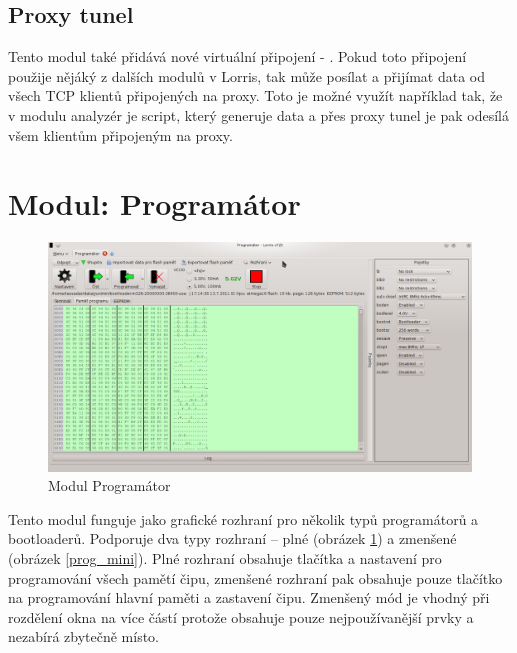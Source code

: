 \documentclass[12pt, a4paper, oneside]{article}
\begin{document}
\subsection{Proxy tunel}
Tento modul také přidává nové virtuální připojení - . Pokud toto připojení použije nějáký z dalších modulů v Lorris, tak může posílat a přijímat data od všech TCP klientů připojených na proxy. Toto je možné využít například tak, že v modulu analyzér je script, který generuje data a přes proxy tunel je pak odesílá všem klientům připojeným na proxy.

\newpage
\setlength{\voffset}{0mm} %
\pagestyle{plain}

\section{Modul: Programátor}
\begin{figure}[H]
\begin{center}
\includegraphics[width=\textwidth]{img/programmer.png}
\caption{Modul Programátor}
\label{prog_full}
\end{center}
\end{figure}

Tento modul funguje jako grafické rozhraní pro několik typů programátorů a bootloaderů. Podporuje dva typy rozhraní -- plné (obrázek \ref{prog_full}) a zmenšené (obrázek \ref{prog_mini}). Plné rozhraní obsahuje tlačítka a nastavení pro programování všech pamětí čipu, zmenšené rozhraní pak obsahuje pouze tlačítko na programování hlavní paměti a zastavení čipu. Zmenšený mód je vhodný při rozdělení okna na více částí protože obsahuje pouze nejpoužívanější prvky a nezabírá zbytečně místo.
\end{document}
